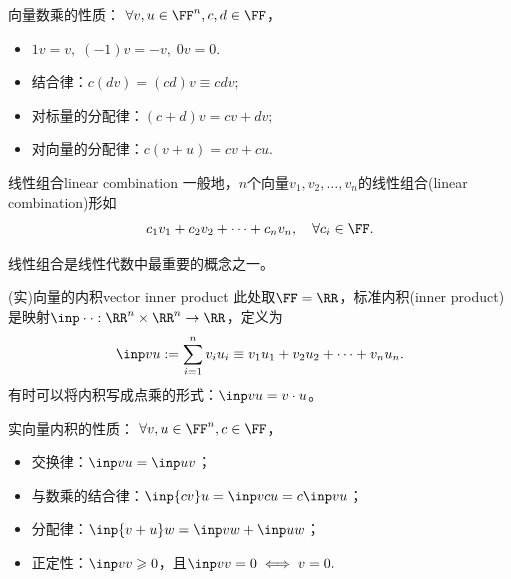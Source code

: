 \begin{corollary}
	向量数乘的性质：%
	$\forall v,u\in\FF^n,c,d\in\FF$，
    \begin{itemize}
    	\item $1v=v,\;(-1)v=-v,\;0v=0.$
    	\item 结合律：$c(dv)=(cd)v\equiv cdv;$
    	\item 对标量的分配律：$(c+d)v=cv+dv;$
    	\item 对向量的分配律：$c(v+u)=cv+cu.$
    \end{itemize}
\end{corollary}

\begin{definition}{线性组合}{linear combination}
	一般地，$n$个向量$v_1,v_2,\ldots,v_n$的线性组合(linear combination)形如
	\[
		c_1v_1+c_2v_2+\cdots+c_nv_n,\quad\forall c_i\in\FF.
	\]
\end{definition}

\begin{remark}
	线性组合是线性代数中最重要的概念之一。
\end{remark}

\begin{definition}{(实)向量的内积}{vector inner product}
	此处取$\FF=\RR$，标准内积(inner product)是映射$\inp\cdot\cdot:\RR^n\times\RR^n\to\RR$，定义为
	\begin{equation}
		\inp vu:=\sum_{i=1}^nv_iu_i\equiv v_1u_1+v_2u_2+\cdots+v_nu_n.
	\end{equation}
	有时可以将内积写成点乘的形式：$\inp vu=v\cdot u$。
\end{definition}

\begin{corollary}
	实向量内积的性质：%
	$\forall v,u\in\FF^n,c\in\FF$，
    \begin{itemize}
    	\item 交换律：$\inp vu=\inp uv$；
    	\item 与数乘的结合律：$\inp{cv}u=\inp v{cu}=c\inp vu$；
    	\item 分配律：$\inp{v+u}w=\inp vw+\inp uw$；
    	\item 正定性：$\inp vv\geqslant 0$，且$\inp vv=0\iff v=0.$
    \end{itemize}
\end{corollary}

